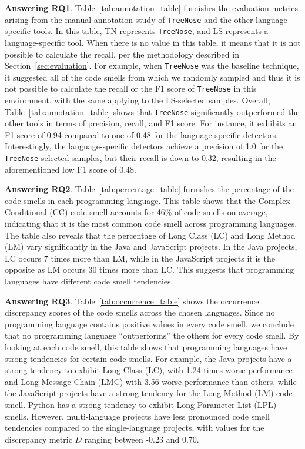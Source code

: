 


{\bf Answering RQ1}. Table~\ref{tab:annotation_table} furnishes the evaluation
metrics arising from the manual annotation study of \texttt{TreeNose} and the
other language-specific tools.
%
In this table, TN represents \texttt{TreeNose}, and LS represents a
language-specific tool.
%
When there is no value in this table, it means that it is not possible to
calculate the recall, per the methodology described in
Section~\ref{sec:evaluation}.
%
For example, when \texttt{TreeNose} was the baseline technique, it suggested
all of the code smells from which we randomly sampled and thus it is not
possible to calculate the recall or the F1 score of \texttt{TreeNose} in this
environment, with the same applying to the LS-selected samples.
%
Overall, Table~\ref{tab:annotation_table} shows that \texttt{TreeNose}
significantly outperformed the other tools in terms of precision, recall, and
F1 score.
%
For instance, it exhibits an F1 score of 0.94 compared to one of 0.48 for the
language-specific detectors.
%
Interestingly, the language-specific detectors achieve a precision of 1.0 for
the \texttt{TreeNose}-selected samples, but their recall is down to 0.32,
resulting in the aforementioned low F1 score of 0.48.


{\bf Answering RQ2}. Table~\ref{tab:percentage_table} furnishes the percentage
of the code smells in each programming language. This table shows that the
Complex Conditional (CC) code smell accounts for 46\% of code smells on
average, indicating that it is the most common code smell across programming
languages.
%
The table also reveals that the percentage of Long Class (LC) and Long Method
(LM) vary significantly in the Java and JavaScript projects. In the Java
projects, LC occurs 7 times more than LM, while in the JavaScript projects it
is the opposite as LM occurs 30 times more than LC. This suggests that
programming languages have different code smell tendencies.

{\bf Answering RQ3}. Table~\ref{tab:occurrence_table} shows the occurrence
discrepancy scores of the code smells across the chosen languages. Since no
programming language contains positive values in every code smell, we conclude
that no programming language ``outperforms'' the others for every code smell.
By looking at each code smell, this table shows that programming languages have
strong tendencies for certain code smells.
%
For example, the Java projects have a strong tendency to exhibit Long Class
(LC), with 1.24 times worse performance and Long Message Chain (LMC) with 3.56
worse performance than others, while the JavaScript projects have a strong
tendency for the Long Method (LM) code smell. Python has a strong tendency to
exhibit Long Parameter List (LPL) smells. However, multi-language projects have
less pronounced code smell tendencies compared to the single-language projects,
with values for the discrepancy metric $D$ ranging between -0.23 and 0.70.
